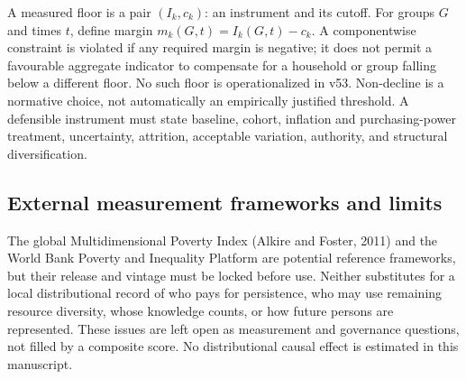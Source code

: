 A measured floor is a pair \((I_k,c_k)\): an instrument and its cutoff. For groups \(G\) and times \(t\), define margin \(m_k(G,t)=I_k(G,t)-c_k\). A componentwise constraint is violated if any required margin is negative; it does not permit a favourable aggregate indicator to compensate for a household or group falling below a different floor. No such floor is operationalized in v53. Non-decline is a normative choice, not automatically an empirically justified threshold. A defensible instrument must state baseline, cohort, inflation and purchasing-power treatment, uncertainty, attrition, acceptable variation, authority, and structural diversification.

\subsection{External measurement frameworks and limits}

The global Multidimensional Poverty Index (Alkire and Foster, 2011) and the World Bank Poverty and Inequality Platform are potential reference frameworks, but their release and vintage must be locked before use. Neither substitutes for a local distributional record of who pays for persistence, who may use remaining resource diversity, whose knowledge counts, or how future persons are represented. These issues are left open as measurement and governance questions, not filled by a composite score. No distributional causal effect is estimated in this manuscript.

